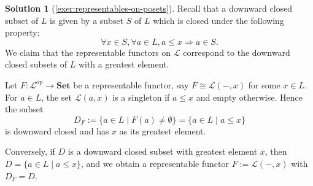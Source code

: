 \documentclass[a4paper,11pt, oneside,titlepage=false]{scrbook}
\theoremstyle{plain}
\theoremstyle{definition}
\newtheorem{solution}[thm]{Solution}
\newcommand{\Catb}[1]{\mathbf{#1}}
\newcommand{\SET}{\Catb{Set}}
\newcommand{\op}[1]{\ensuremath{{#1}^\text{op}}}
\begin{document}
\begin{solution}[\cref{exer:representables-on-posets}]
\label{sol:representables-on-posets}
Recall that a downward closed subset of $L$ is given by a subset $S$ of $L$ which is
closed under the following property:
\[
\forall x \in S, \forall a \in L, a \leq x \Rightarrow a \in S.
\]
We claim that the representable functors on $\mathcal{L}$ correspond to the downward
closed subsets of $L$ with a greatest element.

Let $F : \op{\mathcal{L}} \to \SET$ be a representable functor, say
$F \cong \mathcal{L}(-,x)$ for some $x \in L$.
For $a \in L$, the set $\mathcal{L}(a,x)$ is a singleton if $a \leq x$ and empty
otherwise. Hence the subset
\[
D_F := \{ a \in L \mid F(a) \neq \emptyset \} = \{ a \in L \mid a \leq x \}
\]
is downward closed and has $x$ as its greatest element.

Conversely, if $D$ is a downward closed subset with greatest element $x$, then
$D = \{ a \in L \mid a \leq x \}$, and we obtain a representable functor
$F := \mathcal{L}(-,x)$ with $D_F = D$.
\end{solution}



\printbibliography
\end{document}
